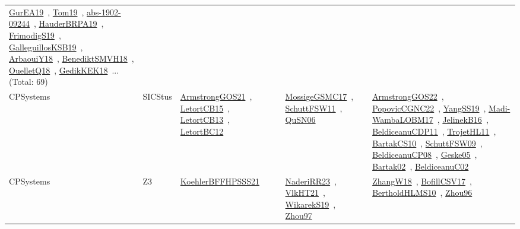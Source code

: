 {\begin{longtable}{lp{3cm}>{\raggedright\arraybackslash}p{6cm}>{\raggedright\arraybackslash}p{6cm}>{\raggedright\arraybackslash}p{8cm}}
\href{articles/GurEA19.pdf}{GurEA19}~\cite{GurEA19}, \href{papers/Tom19.pdf}{Tom19}~\cite{Tom19}, \href{articles/abs-1902-09244.pdf}{abs-1902-09244}~\cite{abs-1902-09244}, \href{articles/HauderBRPA19.pdf}{HauderBRPA19}~\cite{HauderBRPA19}, \href{papers/FrimodigS19.pdf}{FrimodigS19}~\cite{FrimodigS19}, \href{papers/GalleguillosKSB19.pdf}{GalleguillosKSB19}~\cite{GalleguillosKSB19}, \href{papers/ArbaouiY18.pdf}{ArbaouiY18}~\cite{ArbaouiY18}, \href{papers/BenediktSMVH18.pdf}{BenediktSMVH18}~\cite{BenediktSMVH18}, \href{papers/OuelletQ18.pdf}{OuelletQ18}~\cite{OuelletQ18}, \href{articles/GedikKEK18.pdf}{GedikKEK18}~\cite{GedikKEK18}... (Total: 69)\\
CPSystems & SICStus & \href{papers/ArmstrongGOS21.pdf}{ArmstrongGOS21}~\cite{ArmstrongGOS21}, \href{articles/LetortCB15.pdf}{LetortCB15}~\cite{LetortCB15}, \href{papers/LetortCB13.pdf}{LetortCB13}~\cite{LetortCB13}, \href{papers/LetortBC12.pdf}{LetortBC12}~\cite{LetortBC12} & \href{papers/MossigeGSMC17.pdf}{MossigeGSMC17}~\cite{MossigeGSMC17}, \href{articles/SchuttFSW11.pdf}{SchuttFSW11}~\cite{SchuttFSW11}, \href{papers/QuSN06.pdf}{QuSN06}~\cite{QuSN06} & \href{papers/ArmstrongGOS22.pdf}{ArmstrongGOS22}~\cite{ArmstrongGOS22}, \href{papers/PopovicCGNC22.pdf}{PopovicCGNC22}~\cite{PopovicCGNC22}, \href{papers/YangSS19.pdf}{YangSS19}~\cite{YangSS19}, \href{papers/Madi-WambaLOBM17.pdf}{Madi-WambaLOBM17}~\cite{Madi-WambaLOBM17}, \href{papers/JelinekB16.pdf}{JelinekB16}~\cite{JelinekB16}, \href{articles/BeldiceanuCDP11.pdf}{BeldiceanuCDP11}~\cite{BeldiceanuCDP11}, \href{articles/TrojetHL11.pdf}{TrojetHL11}~\cite{TrojetHL11}, \href{articles/BartakCS10.pdf}{BartakCS10}~\cite{BartakCS10}, \href{papers/SchuttFSW09.pdf}{SchuttFSW09}~\cite{SchuttFSW09}, \href{papers/BeldiceanuCP08.pdf}{BeldiceanuCP08}~\cite{BeldiceanuCP08}, \href{papers/Geske05.pdf}{Geske05}~\cite{Geske05}, \href{papers/Bartak02.pdf}{Bartak02}~\cite{Bartak02}, \href{papers/BeldiceanuC02.pdf}{BeldiceanuC02}~\cite{BeldiceanuC02}\\
CPSystems & Z3 & \href{articles/KoehlerBFFHPSSS21.pdf}{KoehlerBFFHPSSS21}~\cite{KoehlerBFFHPSSS21} & \href{articles/NaderiRR23.pdf}{NaderiRR23}~\cite{NaderiRR23}, \href{articles/VlkHT21.pdf}{VlkHT21}~\cite{VlkHT21}, \href{articles/WikarekS19.pdf}{WikarekS19}~\cite{WikarekS19}, \href{articles/Zhou97.pdf}{Zhou97}~\cite{Zhou97} & \href{articles/ZhangW18.pdf}{ZhangW18}~\cite{ZhangW18}, \href{papers/BofillCSV17.pdf}{BofillCSV17}~\cite{BofillCSV17}, \href{papers/BertholdHLMS10.pdf}{BertholdHLMS10}~\cite{BertholdHLMS10}, \href{papers/Zhou96.pdf}{Zhou96}~\cite{Zhou96}\\

\end{longtable}}
